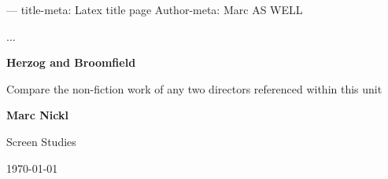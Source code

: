 ---
title-meta: Latex title page
Author-meta: Marc AS WELL

...

\begin{titlepage}
    \begin{center}
        \vspace*{4cm}
            
        
        \LARGE
        \textbf{Herzog and Broomfield}
            
        \vspace{0.5cm}
        \Large
        Compare the non-fiction work of any two directors referenced within this unit
            
        \vspace{10cm}
            
        \textbf{Marc Nickl}
            
        \vfill
            
            
        \vspace{0.8cm}
                        
        \large
        Screen Studies 
        
\today
            
    \end{center}
\end{titlepage}